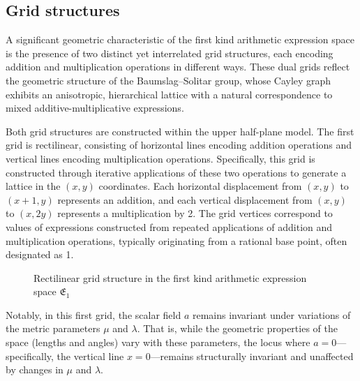 \subsection{Grid structures}\label{subsec:grids}

A significant geometric characteristic of the first kind arithmetic expression space is the presence of two distinct yet interrelated grid structures, each encoding addition and multiplication operations in different ways. These dual grids reflect the geometric structure of the Baumslag–Solitar group, whose Cayley graph exhibits an anisotropic, hierarchical lattice with a natural correspondence to mixed additive-multiplicative expressions.

Both grid structures are constructed within the upper half-plane model. The first grid is rectilinear, consisting of horizontal lines encoding addition operations and vertical lines encoding multiplication operations. Specifically, this grid is constructed through iterative applications of these two operations to generate a lattice in the $(x,y)$ coordinates. Each horizontal displacement from $(x,y)$ to $(x+1,y)$ represents an addition, and each vertical displacement from $(x,y)$ to $(x,2y)$ represents a multiplication by 2. The grid vertices correspond to values of expressions constructed from repeated applications of addition and multiplication operations, typically originating from a rational base point, often designated as 1.

\begin{figure}[ht]
\centering
{}
\caption{Rectilinear grid structure in the first kind arithmetic expression space $\mathfrak{E}_1$}\label{fig:grid1}
\end{figure}

Notably, in this first grid, the scalar field $a$ remains invariant under variations of the metric parameters $\mu$ and $\lambda$. That is, while the geometric properties of the space (lengths and angles) vary with these parameters, the locus where $a=0$—specifically, the vertical line $x=0$—remains structurally invariant and unaffected by changes in $\mu$ and $\lambda$.

